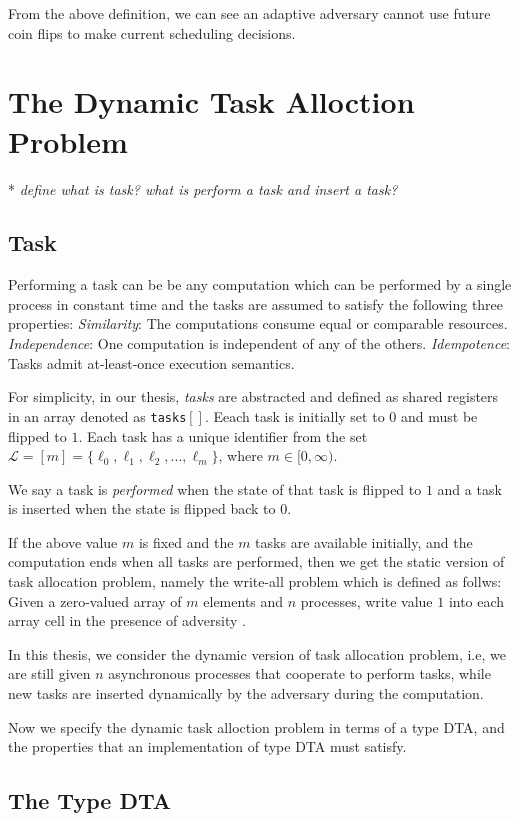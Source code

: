 From the above definition, we can see an adaptive adversary cannot use
future coin flips to make current scheduling decisions.

\section{The Dynamic Task Alloction Problem}
* \emph{define what is task? what is perform a task and insert a task?}
\subsection{Task}
Performing a task can be be any computation which can be performed by a single
process in constant time \cite{georgiou2007all} and the tasks are assumed to satisfy the following three
properties:
\emph{Similarity}: The computations consume equal or comparable resources.
\emph{Independence}: One computation is independent of any of the others.
\emph{Idempotence}: Tasks admit at-least-once execution semantics.

For simplicity, in our thesis, \emph{tasks} are abstracted and defined as shared registers in an array
denoted as \texttt{tasks}$[]$. Eeach task is initially set to $0$ and must be flipped to $1$.
Each task has a unique identifier from the set
$\mathcal{L} = [m] = \{\ell_0, \ell_1, \ell_2,..., \ell_m\}$, where $m \in [0, \infty)$.

We say a task is \emph{performed} when the state of that task is flipped to $1$ and a task is inserted
when the state is flipped back to $0$.

If the above value $m$ is fixed and the $m$ tasks are available initially, and the computation ends when all
tasks are performed, then we get the static version of task allocation problem, namely the write-all problem which
is defined as follws: Given a zero-valued array of $m$ elements and $n$ processes,
write value $1$ into each array cell in the presence of adversity \cite{kanellakis1992efficient}.

In this thesis, we consider the dynamic version of task allocation problem, i.e, we are still given $n$
asynchronous processes that cooperate to perform tasks, while new tasks are inserted
dynamically by the adversary during the computation.

Now we specify the dynamic task alloction problem in terms of a type DTA, and the properties
that an implementation of type DTA must satisfy.

\subsection{The Type DTA}

